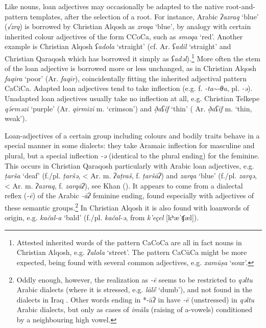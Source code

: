\documentclass[output=paper]{langsci/langscibook}
\begin{document}
Like nouns, loan adjectives may occasionally be adapted to the native {root-and-pattern} templates, after the selection of a {root}. For instance, Arabic \textit{ʔazraq} ‘blue’ (\textit{√zrq}) is borrowed by Christian Alqosh as \textit{zroqa} ‘blue’, by {analogy} with certain inherited colour adjectives of the form CCoCa, such as \textit{smoqa} ‘red’. Another example is Christian Alqosh \textit{ʕadola} ‘straight’ (cf.  Ar. \textit{ʕadil} ‘straight’ and Christian Qaraqosh which has borrowed it simply as \textit{ʕadəl}).\footnote{Attested inherited words of the pattern CaCoCa are all in fact nouns in Christian Alqosh, e.g. \textit{ʔalola} ‘street’. The pattern CaCūCa might be more expected, being found with several common adjectives, e.g. \textit{xamūṣa} ‘sour’.} More often the {stem} of the loan adjective is borrowed more or less unchanged, as in Christian Alqosh \textit{faqira} ‘poor’ (Ar. \textit{faqīr}), coincidentally fitting the inherited adjectival pattern CaCiCa. Adapted loan adjectives tend to take  {inflection} (e.g. f. \textit{{}-ta{\textasciitilde}-θa}, pl. \textit{{}-ə}). Unadapted loan adjectives usually take no {inflection} at all, e.g. Christian Telkepe \textit{qə́rməzi} ‘purple’ (Ar. \textit{qirmizī} m. ‘crimson’) and \textit{ð̣aʕíf} ‘thin’ ( Ar. \textit{ð̣aʕīf} m. ‘thin, weak’).

Loan-adjectives of a certain group including colours and bodily traits behave in a special manner in some  dialects: they take Aramaic {inflection} for masculine and plural, but a special {inflection} \textit{\nobreakdash-ə} (identical to the plural ending) for the feminine. This occurs in Christian Qaraqosh particularly with Arabic loan adjectives, e.g. \textit{ṭarša} ‘deaf’ (f./pl. \textit{ṭaršə}, < Ar. m. \textit{ʔaṭraš}, f. \textit{ṭaršāʔ}) and \textit{zarqa} ‘blue’ (f./pl. \textit{zarqə}, < Ar. m. \textit{ʔazraq}, f. \textit{zarqāʔ}), see Khan (\citeyear[219]{Khan2002}). It appears to come from a dialectal reflex (\textit{\nobreakdash-ē}) of the Arabic \textit{\nobreakdash-āʔ} feminine ending, found especially with adjectives of these semantic groups.\footnote{Oddly enough, however, the realization as \textit{-ē} seems to be restricted to  \textit{qəltu} Arabic dialects (where it is stressed, e.g.  \textit{lāl\'{ē}} ‘dumb’), and not found in the dialects in Iraq \citep[76]{Jastrow1978}. Other words ending in *{}-āʔ in have \textit{{}-ē} (unstressed) in \textit{qəltu} Arabic dialects, but only as cases of \textit{imāla} (raising of a-vowels) conditioned by a neighbouring high vowel.}  In Christian Alqosh it is also found with {loanwords} of  origin, e.g. \textit{kačal-a} ‘bald’ (f./pl. \textit{kačal\nobreakdash-ə}, from  \textit{k’eçel} [kʰæˈʧæl]).
\end{document}
